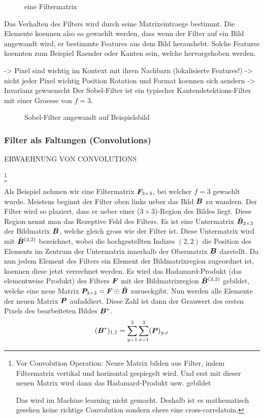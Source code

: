 \documentclass[../main]{subfiles}
\begin{document}
\begin{figure}[h!]

  \caption{eine Filtermatrix}
  \label{fig:filtermatrix}
\end{figure}
\para{}
Das Verhalten des Filters wird durch seine Matrixeintraege bestimmt.
Die Elemente koennen also so gewaehlt werden, dass wenn der Filter auf ein Bild
angewandt wird, er bestimmte Features aus dem Bild heraushebt. Solche Features
koennten zum Beispiel Raender oder Kanten sein, welche hervorgehoben werden.

-> Pixel sind wichtig im Kontext mit ihren Nachbarn (lokalisierte Features!)
-> nicht jeder Pixel wichtig
Position Rotation und Format koennen sich aendern -> Invarianz gewuenscht
\para{}
Der Sobel-Filter ist ein typischer Kantendetektions-Filter mit einer
Groesse von $f = 3$.

\begin{figure}[h!]

  \caption{Sobel-Filter angewandt auf Beispielsbild}
\end{figure}
\para{}

\subsubsection{Filter als Faltungen (Convolutions)}
ERWAEHNUNG VON CONVOLUTIONS

\footnote{
  Vor Convolution Operation: Neure Matrix bilden aus Filter, indem Filtermatrix
  vertikal und horizontal gespiegelt wird. Und erst mit dieser neuen Matrix wird
  dann das Hadamard-Produkt usw. gebildet

  Das wird im Machine learning nicht gemacht. Deshalb ist es mathematisch gesehen
  keine richtige Convolution sondern ehere eine cross-correlatoin.
}



Als Beispiel nehmen wir eine Filtermatrix $\bm{F}_{3 \times 3}$, bei welcher
$f = 3$ gewaehlt wurde.
Meistens beginnt der Filter oben links ueber das Bild $\bm{B}$ zu wandern. Der
Filter wird so plaziert, dass er ueber einer ($3 \times 3$)-Region des Bildes liegt.
Diese Region nennt man das Rezeptive Feld des Filters. Es ist eine Untermatrix $\tilde{\bm{B}}_{3 \times 3}$ der Bildmatrix
$\bm{B}$, welche gleich gross wie der Filter ist.
Diese Untermatrix wird mit
$\tilde{\bm{B}}^{(2,2)}$ bezeichnet, wobei die hochgestellten Indizes $(2,2)$ die Position
des Elements im Zentrum der Untermatrix innerhalb der Obermatrix $\bm{B}$
darstellt.
\para{}
Da nun jedem Element des Filters ein Element der Bildmatrixregion
zugeordnet ist, koennen diese jetzt verrechnet werden. Es wird
das Hadamard-Produkt (das elementweise Produkt) des Filters $\bm{F}$ mit der
Bildmatrixregion $\tilde{\bm{B}}^{(2,2)}$ gebildet, welche eine neue Matrix $\bm{P}_{3 \times 3} = \bm{F} \odot
\tilde{\bm{B}}$ zurueckgibt. Nun werden alle Elemente der neuen Matrix $\bm{P}$
aufaddiert. Diese Zahl ist dann der Grauwert des ersten Pixels des bearbeiteten
Bildes $\bm{B}^*$.
\begin{equation*}
  (\bm{B}^*)_{1,1} = \sum_{y=1}^3 \sum_{x=1}^3 (\bm{P})_{y,x}
\end{equation*}
\end{document}
